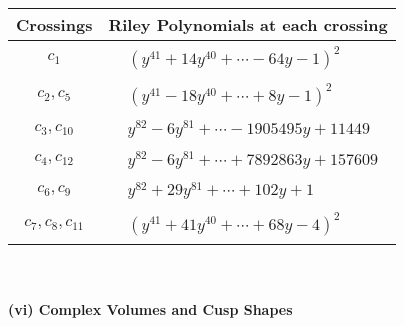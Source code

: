 \documentclass[1p]{elsarticle_modified}
\theoremstyle{definition}
\begin{document}
\begin{tabular}{m{50pt}|m{274pt}}
Crossings & \hspace{64pt}Riley Polynomials at each crossing \\
\hline $$\begin{aligned}c_{1}\end{aligned}$$&$\begin{aligned}
&(y^{41}+14 y^{40}+\cdots-64 y-1)^{2}
\end{aligned}$\\
\hline $$\begin{aligned}c_{2},c_{5}\end{aligned}$$&$\begin{aligned}
&(y^{41}-18 y^{40}+\cdots+8 y-1)^{2}
\end{aligned}$\\
\hline $$\begin{aligned}c_{3},c_{10}\end{aligned}$$&$\begin{aligned}
&y^{82}-6 y^{81}+\cdots-1905495 y+11449
\end{aligned}$\\
\hline $$\begin{aligned}c_{4},c_{12}\end{aligned}$$&$\begin{aligned}
&y^{82}-6 y^{81}+\cdots+7892863 y+157609
\end{aligned}$\\
\hline $$\begin{aligned}c_{6},c_{9}\end{aligned}$$&$\begin{aligned}
&y^{82}+29 y^{81}+\cdots+102 y+1
\end{aligned}$\\
\hline $$\begin{aligned}c_{7},c_{8},c_{11}\end{aligned}$$&$\begin{aligned}
&(y^{41}+41 y^{40}+\cdots+68 y-4)^{2}
\end{aligned}$\\
\hline
\end{tabular}\\~\\
\newpage\flushleft \textbf{(vi) Complex Volumes and Cusp Shapes}
\end{document}
